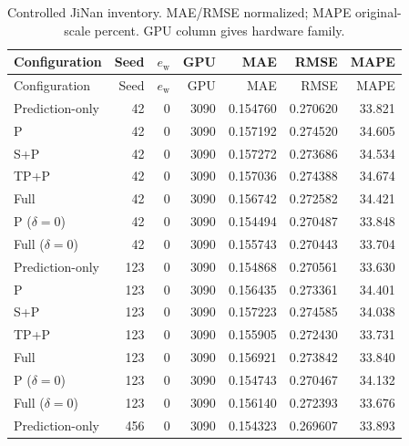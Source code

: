 \documentclass[a4paper,10pt]{article}
\begin{document}
\begingroup\footnotesize\setlength{\tabcolsep}{4pt}
\begin{longtable}{lrrrrrr}
\caption{Controlled JiNan inventory. MAE/RMSE normalized; MAPE original-scale percent. GPU column gives hardware family.}\\
\toprule
Configuration & Seed & $e_{\mathrm{w}}$ & GPU & MAE & RMSE & MAPE \\
\midrule\endfirsthead
\toprule
Configuration & Seed & $e_{\mathrm{w}}$ & GPU & MAE & RMSE & MAPE \\
\midrule\endhead

Prediction-only & 42 & 0 & 3090 & 0.154760 & 0.270620 & 33.821 \\

P & 42 & 0 & 3090 & 0.157192 & 0.274520 & 34.605 \\

S+P & 42 & 0 & 3090 & 0.157272 & 0.273686 & 34.534 \\

TP+P & 42 & 0 & 3090 & 0.157036 & 0.274388 & 34.674 \\

Full & 42 & 0 & 3090 & 0.156742 & 0.272582 & 34.421 \\

P ($\delta=0$) & 42 & 0 & 3090 & 0.154494 & 0.270487 & 33.848 \\

Full ($\delta=0$) & 42 & 0 & 3090 & 0.155743 & 0.270443 & 33.704 \\

Prediction-only & 123 & 0 & 3090 & 0.154868 & 0.270561 & 33.630 \\

P & 123 & 0 & 3090 & 0.156435 & 0.273361 & 34.401 \\

S+P & 123 & 0 & 3090 & 0.157223 & 0.274585 & 34.038 \\

TP+P & 123 & 0 & 3090 & 0.155905 & 0.272430 & 33.731 \\

Full & 123 & 0 & 3090 & 0.156921 & 0.273842 & 33.840 \\

P ($\delta=0$) & 123 & 0 & 3090 & 0.154743 & 0.270467 & 34.132 \\

Full ($\delta=0$) & 123 & 0 & 3090 & 0.156140 & 0.272393 & 33.676 \\

Prediction-only & 456 & 0 & 3090 & 0.154323 & 0.269607 & 33.893 \\


\end{longtable}
\end{document}
